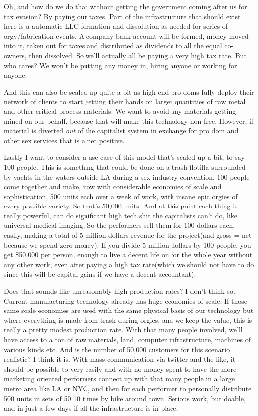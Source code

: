 Oh, and how do we do that without getting the government coming after us
for tax evasion? By paying our taxes. Part of the infrastructure that
should exist here is a automatic LLC formation and dissolution as needed
for series of orgy/fabrication events. A company bank account will be
formed, money moved into it, taken out for taxes and distributed as
dividends to all the equal co-owners, then dissolved. So we'll actually
all be paying a very high tax rate. But who cares? We won't be putting
any money in, hiring anyone or working for anyone.

And this can also be scaled up quite a bit as high end pro doms fully
deploy their network of clients to start getting their hands on larger
quantities of raw metal and other critical process materials. We want to
avoid any materials getting mined on our behalf, because that will make
this technology non-free. However, if material is diverted \emph{out} of
the capitalist system in exchange for pro dom and other sex services
that is a net positive.

Lastly I want to consider a use case of this model that's scaled up a
bit, to say 100 people. This is something that could be done on a trash
flotilla surrounded by yachts in the waters outside LA during a sex
industry convention. 100 people come together and make, now with
considerable economies of scale and sophistication, 500 units each over
a week of work, with insane epic orgies of every possible variety. So
that's 50,000 units. And at this point each thing is really powerful,
can do significant high tech shit the capitalists can't do, like
universal medical imaging. So the performers sell them for 100 dollars
each, easily, making a total of 5 million dollars revenue for the
project(and gross = net because we spend zero money). If you divide 5
million dollars by 100 people, you get \$50,000 per person, enough to
live a decent life on for the whole year without any other work, even
after paying a high tax rate(which we should not have to do since this
will be capital gains if we have a decent accountant).

Does that sounds like unreasonably high production rates? I don't think
so. Current manufacturing technology already has huge economies of
scale. If those same scale economies are used with the same physical
basis of our technology but where everything is made from trash during
orgies, and we keep the value, this is really a pretty modest production
rate. With that many people involved, we'll have access to a ton of raw
materials, land, computer infrastructure, machines of various kinds etc.
And is the number of 50,000 customers for this scenario realistic? I
think it is. With mass communication via twitter and the like, it should
be possible to very easily and with no money spent to have the more
marketing oriented performers connect up with that many people in a
large metro area like LA or NYC, and then for each performer to
personally distribute 500 units in sets of 50 10 times by bike around
town. Serious work, but doable, and in just a few days if all the
infrastructure is in place.

